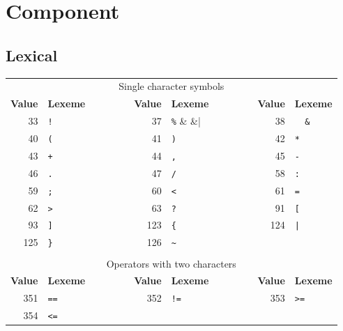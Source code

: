 \documentclass{report}
\newcommand{\+}{}
\begin{document}
    \section{Component}\label{sec:component}

    \subsection{Lexical}\label{subsec:lexical}
    \begin{table}[t]
        \centering
        \begin{tabular}{rlcrlcrl}
            \multicolumn{8}{c}{Single character symbols}
            \\[1mm]
            {\bf Value} & {\bf Lexeme}
            & ~~~~~~ &
                {\bf Value} & {\bf Lexeme}
            & ~~~~~~ &
                {\bf Value} & {\bf Lexeme}
            \\ \cline{1-2} \cline{4-5} \cline{7-8}
            33 & \verb|!| & &
            37 & \verb|%| & &
            38 & \verb|  &  | \\
            40 & \verb|(| & &
            41 & \verb|)| & &
            42 & \verb|*| \\
            43 & \verb|+| & &
            44 & \verb|,| & &
            45 & \verb|-| \\
            46 & \verb|.| & &
            47 & \verb|/| & &
            58 & \verb|:| \\
            59 & \verb|;| & &
            60 & \verb|<| & &
            61 & \verb|=| \\
            62 & \verb|>| & &
            63 & \verb|?| & &
            91 & \verb|[| \\
            93 & \verb|]| & &
            123 & \verb|{| & &
            124 & \verb+|+ \\
            125 & \verb|}| & &
            126 & \verb|~| \\
            \\
            \multicolumn{8}{c}{Operators with two characters}
            \\[1mm]
            {\bf Value} & {\bf Lexeme}
            & ~~~~~~ &
                {\bf Value} & {\bf Lexeme}
            & ~~~~~~ &
                {\bf Value} & {\bf Lexeme}
            \\ \cline{1-2} \cline{4-5} \cline{7-8}
            351 & \verb|==| & &
            352 & \verb|!=| & &
            353 & \verb|>=| \\
            354 & \verb|<=| & &

\end{tabular}
\end{table}
\end{document}
